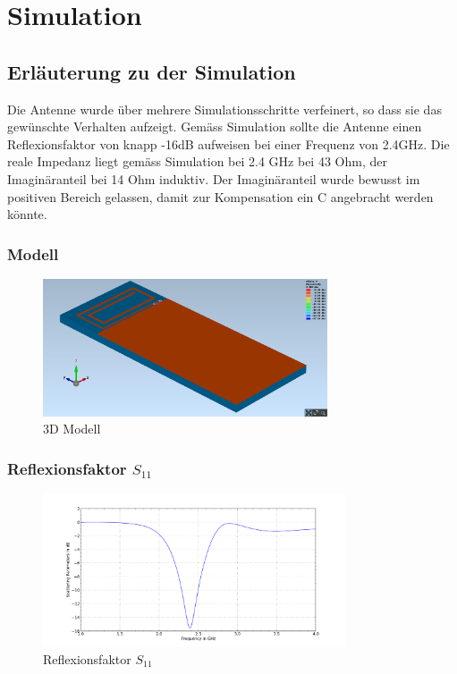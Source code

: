 \section{Simulation}

\subsection{Erläuterung zu der Simulation}
Die Antenne wurde über mehrere Simulationsschritte verfeinert, so dass sie das gewünschte Verhalten aufzeigt. Gemäss Simulation sollte die Antenne einen Reflexionsfaktor von knapp -16dB aufweisen bei einer Frequenz von 2.4GHz. Die reale Impedanz liegt gemäss Simulation bei 2.4 GHz bei 43 Ohm, der Imaginäranteil bei 14 Ohm induktiv. Der Imaginäranteil wurde bewusst im positiven Bereich gelassen, damit zur Kompensation ein C angebracht werden könnte.

\subsubsection{Modell}

\begin{figure}[h!]
	\centering
	\includegraphics[width=0.75\textwidth]{../fig/plt/crazy_stuff_l2_3d_model.png}
	\caption{3D Modell}
\end{figure}



\clearpage
\subsubsection{Reflexionsfaktor $S_{11}$}
\begin{figure}[h!]
	\centering
	\includegraphics[width=0.8\textwidth]{../fig/plt/crazy_stuff_l2_s11.png}
	\caption{Reflexionsfaktor $S_{11}$}
\end{figure}

